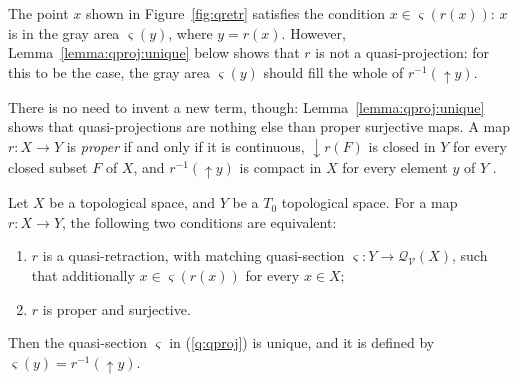 \documentclass{LMCS}
\newcommand\Smyth{\mathcal Q}
\newcommand\V{{\mathcal V}}
\newcommand\SV{\Smyth_\V}
\newcommand\upc{\mathop{\uparrow}\nolimits}
\newcommand\dc{\mathop{\downarrow}\nolimits}
\newcommand\qs{\varsigma}
\begin{document}
The point $x$ shown in Figure~\ref{fig:qretr} satisfies the condition
$x \in \qs (r (x))$: $x$ is in the gray area $\qs (y)$, where $y = r
(x)$.  However, Lemma~\ref{lemma:qproj:unique} below shows that $r$ is
not a quasi-projection: for this to be the case, the gray area $\qs
(y)$ should fill the whole of $r^{-1} (\upc y)$.

There is no need to invent a new term, though:
Lemma~\ref{lemma:qproj:unique} shows that quasi-projections are
nothing else than proper surjective maps.
A map $r : X \to Y$ is {\em proper\/} if and only if it is continuous,
$\dc r (F)$ is closed in $Y$ for every closed subset $F$ of $X$, and
$r^{-1} (\upc y)$ is compact in $X$ for every element $y$ of $Y$
\cite[Lemma~VI-6.21~$(i)$]{GHKLMS:contlatt}.
\begin{lem}
  \label{lemma:qproj:unique}
  Let $X$ be a topological space, and $Y$ be a $T_0$ topological
  space.  For a map $r : X \to Y$, the following two conditions are
  equivalent:
  \begin{enumerate}[\em(1)]
  \item\label{q:qproj} $r$ is a quasi-retraction, with matching
    quasi-section $\qs : Y \to \SV (X)$, such that additionally $x \in
    \qs (r (x))$ for every $x \in X$;
  \item $r$ is proper and surjective.
  \end{enumerate}
  Then the quasi-section $\qs$ in (\ref{q:qproj}) is unique, and it is
  defined by $\qs (y) = r^{-1} (\upc y)$.
\end{lem}
\end{document}
